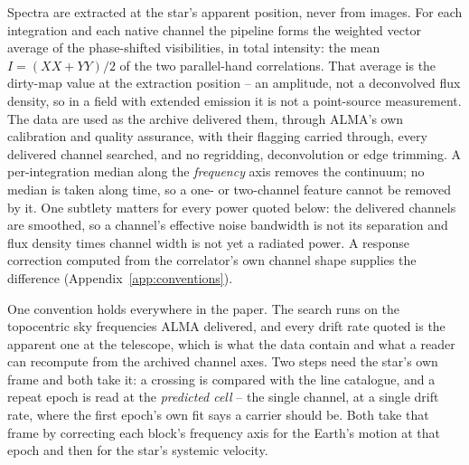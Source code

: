 Spectra are extracted at the star's apparent position, never from images.
For each integration and each native channel the pipeline forms the weighted
vector average of the phase-shifted visibilities, in total intensity: the
mean $I=(XX+YY)/2$ of the two parallel-hand correlations. That average is the
dirty-map value at the extraction position -- an amplitude, not a
deconvolved flux density, so in a field with extended emission it is not a
point-source measurement. The data are used as the archive delivered them,
through ALMA's own calibration and quality assurance, with their flagging
carried through, every delivered channel searched, and no regridding,
deconvolution or edge trimming. A per-integration median along the
\emph{frequency} axis removes the continuum; no median is taken along
time, so a one- or two-channel feature cannot be removed by it. One
subtlety matters for every power quoted below: the delivered channels are
smoothed, so a channel's effective noise bandwidth is not its separation
and flux density times channel width is not yet a radiated power. A
response correction computed from the correlator's own channel shape
supplies the difference (Appendix~\ref{app:conventions}).

One convention holds everywhere in the paper. The search runs on the
topocentric sky frequencies ALMA delivered, and every drift rate quoted is
the apparent one at the telescope, which is what the data contain and what
a reader can recompute from the archived channel axes. Two steps need the
star's own frame and both take it: a crossing is compared with the line catalogue, and a repeat epoch is read
at the \emph{predicted cell} -- the single channel, at a single drift rate,
where the first epoch's own fit says a carrier should be. Both take that
frame by correcting each block's frequency axis for the Earth's motion at
that epoch and then for the star's systemic velocity.

